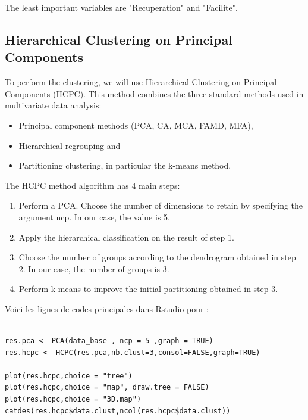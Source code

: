 \documentclass[12pt]{article}
\begin{document}
The least important variables are "Recuperation" and "Facilite".

\newpage   


\subsection{Hierarchical Clustering on Principal Components}

To perform the clustering, we will use Hierarchical Clustering on Principal Components (HCPC).
This method combines the three standard methods used in multivariate data analysis:

    
 \begin{itemize}
    \item  Principal component methods (PCA, CA, MCA, FAMD, MFA),
    \item  Hierarchical regrouping and
    \item  Partitioning clustering, in particular the k-means method.
 \end{itemize}

\vspace{0.2 cm}

The HCPC method algorithm has 4 main steps:

\begin{enumerate}
    \item  Perform a PCA. Choose the number of dimensions to retain by specifying the argument ncp. In our case, the value is 5.
    \item Apply the hierarchical classification on the result of step 1.
    \item Choose the number of groups according to the dendrogram obtained in step 2. In our case, the number of groups is 3.
    \item Perform k-means to improve the initial partitioning obtained in step 3.
\end{enumerate}



Voici les lignes de codes principales dans Rstudio pour :

\begin{lstlisting}

res.pca <- PCA(data_base , ncp = 5 ,graph = TRUE)
res.hcpc <- HCPC(res.pca,nb.clust=3,consol=FALSE,graph=TRUE)

plot(res.hcpc,choice = "tree")
plot(res.hcpc,choice = "map", draw.tree = FALSE)
plot(res.hcpc,choice = "3D.map")
catdes(res.hcpc$data.clust,ncol(res.hcpc$data.clust))

\end{lstlisting}
\end{document}
